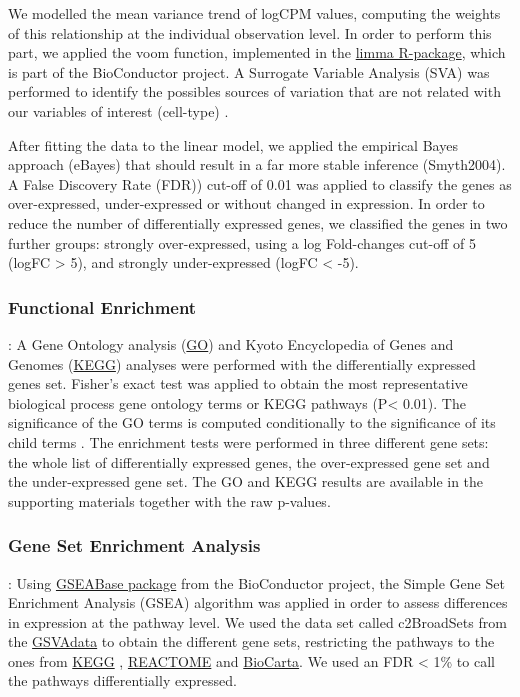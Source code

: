 \documentclass[9pt,twocolumn,twoside]{gsajnl}
\begin{document}
We modelled the mean variance trend of logCPM values, computing the weights of this relationship at the individual observation level. In order to perform this part, we applied the voom function, implemented in the \href{https://bioconductor.org/packages/release/bioc/html/limma.html}{limma R-package}, which is part of the BioConductor project. A Surrogate Variable Analysis (SVA) was performed to identify the possibles sources of variation that are not related with our variables of interest (cell-type)  \citep{Leek2007}.

After fitting the data to the linear model, we applied the 	empirical Bayes approach (eBayes) that should result in a far more stable inference (Smyth2004). A False Discovery Rate (FDR)) \citep{Benjamini1995} cut-off of 0.01 was applied to classify the genes as over-expressed, under-expressed or without changed in expression. In order to reduce the number of differentially expressed genes, we classified the genes in two further groups: strongly over-expressed, using a log Fold-changes cut-off of 5 (logFC > 5), and strongly under-expressed (logFC < -5). 

\subsubsection*{Functional Enrichment}
: A Gene Ontology analysis (\href{http://geneontology.org}{GO}) and Kyoto Encyclopedia of Genes and Genomes (\href{http://www.genome.jp/kegg/}{KEGG}) analyses were performed with the differentially expressed genes set. Fisher's exact test \citep{Fisher1922} was applied to obtain the most representative biological process gene ontology terms or KEGG pathways (P< 0.01). The significance of the GO terms is computed conditionally to the significance of its child terms \citep{Alexa2006}. The enrichment tests were performed in three different gene sets: the whole list of differentially expressed genes, the over-expressed gene set and the under-expressed gene set. The GO and KEGG results are available in the supporting materials together with the raw p-values.

\subsubsection*{Gene Set Enrichment Analysis}
:  Using \href{http://bioconductor.org/packages/release/bioc/html/GSEABase.html}{GSEABase package} from the BioConductor project, the Simple Gene Set Enrichment Analysis (GSEA) algorithm \citep{Subramanian2005, Irizarry2009} was applied in order to assess differences in  expression at the pathway level. We used the data set called c2BroadSets from the \href{https://bioconductor.org/packages/release/data/experiment/html/GSVAdata.html}{GSVAdata} to obtain the different gene sets, restricting the pathways to the ones from \href{http://www.genome.jp/kegg/}{KEGG} , \href{http://www.reactome.org}{REACTOME} and \href{http://www.genecarta.com}{BioCarta}. We used an FDR < 1\% to call the pathways differentially expressed.
\end{document}

